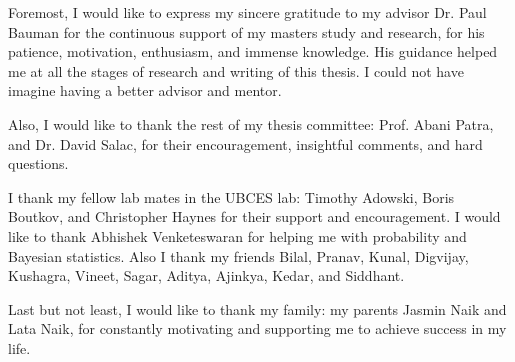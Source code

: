  Foremost, I would like to express my sincere gratitude to my advisor Dr. Paul Bauman for the continuous support of my masters study and research, for his patience, motivation, enthusiasm, and immense knowledge. His guidance helped me at all the stages of research and writing of this thesis. I could not have imagine having a better advisor and mentor.

 Also, I would like to thank the rest of my thesis committee: Prof. Abani Patra,  and Dr. David Salac, for their encouragement, insightful comments, and hard questions.



 I thank my fellow lab mates in the UBCES lab: Timothy Adowski, Boris Boutkov, and Christopher Haynes for their support and encouragement. I would like to thank Abhishek Venketeswaran for helping me with probability and Bayesian statistics. Also I thank my friends Bilal, Pranav, Kunal, Digvijay, Kushagra, Vineet, Sagar, Aditya, Ajinkya, Kedar, and Siddhant.


 Last but not least, I would like to thank my family: my parents Jasmin Naik and Lata Naik, for constantly motivating and supporting me to achieve success in my life. 
